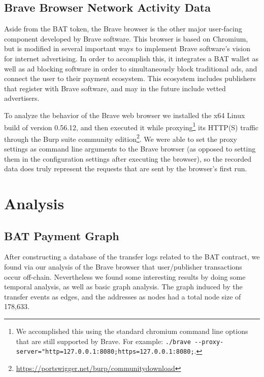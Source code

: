 \documentclass[sigconf]{acmart}
\begin{document}
\subsection{Brave Browser Network Activity Data}
Aside from the BAT token, the Brave browser is the
other major user-facing component developed by Brave software.
This browser is based on Chromium, but is modified
in several important ways to implement Brave software's
vision for internet advertising.
In order to accomplish this, it integrates a BAT wallet as well as
ad blocking software in order to simultaneously
block traditional ads, and connect the user to
their payment ecosystem. This ecosystem includes publishers that
register with Brave software, and may in the future
include vetted advertisers.

To analyze the behavior of the Brave web browser we
installed the x64 Linux build of version 0.56.12\cite{brave-browser},
and then executed it while
proxying\footnote{We accomplished this using the
standard chromium command line options that are still supported by Brave. For example: \lstinline[language=TeX]|./brave --proxy-server="http=127.0.0.1:8080;https=127.0.0.1:8080;|.}
its HTTP(S) traffic through
the Burp suite community edition\footnote{\url{https://portswigger.net/burp/communitydownload}}.
We were able to set the proxy settings as command line arguments to the Brave browser
(as opposed to setting them in the configuration settings after
executing the browser), so the recorded data does truly represent the 
requests that are sent by the browser's first run.

\section{Analysis}
\subsection{BAT Payment Graph}
After constructing a database of the transfer logs related to
the BAT contract, we found via our analysis of the Brave browser
that user/publisher transactions occur off-chain.
Nevertheless we found some interesting results by
doing some temporal analysis, as well as basic
graph analysis. The graph induced by the transfer events
as edges, and the addresses as nodes had a total
node size of 178,633.
\end{document}
